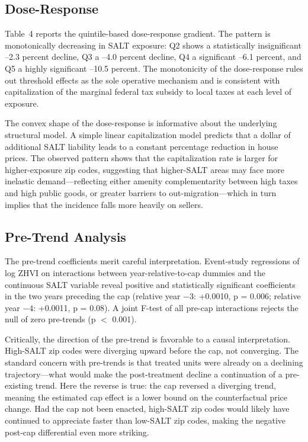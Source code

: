 \documentclass[12pt]{article}
\begin{document}
\subsection{Dose-Response}

Table~4 reports the quintile-based dose-response gradient. The pattern is monotonically decreasing in SALT exposure: Q2 shows a statistically insignificant --2.3 percent decline, Q3 a --4.0 percent decline, Q4 a significant --6.1 percent, and Q5 a highly significant --10.5 percent. The monotonicity of the dose-response rules out threshold effects as the sole operative mechanism and is consistent with capitalization of the marginal federal tax subsidy to local taxes at each level of exposure.



The convex shape of the dose-response is informative about the underlying structural model. A simple linear capitalization model predicts that a dollar of additional SALT liability leads to a constant percentage reduction in house prices. The observed pattern shows that the capitalization rate is larger for higher-exposure zip codes, suggesting that higher-SALT areas may face more inelastic demand---reflecting either amenity complementarity between high taxes and high public goods, or greater barriers to out-migration---which in turn implies that the incidence falls more heavily on sellers.

\subsection{Pre-Trend Analysis}

The pre-trend coefficients merit careful interpretation. Event-study regressions of log ZHVI on interactions between year-relative-to-cap dummies and the continuous SALT variable reveal positive and statistically significant coefficients in the two years preceding the cap (relative year $-3$: +0.0010, p = 0.006; relative year $-4$: +0.0011, p = 0.08). A joint F-test of all pre-cap interactions rejects the null of zero pre-trends (p $<$ 0.001).

Critically, the direction of the pre-trend is favorable to a causal interpretation. High-SALT zip codes were diverging upward before the cap, not converging. The standard concern with pre-trends is that treated units were already on a declining trajectory---what would make the post-treatment decline a continuation of a pre-existing trend. Here the reverse is true: the cap reversed a diverging trend, meaning the estimated cap effect is a lower bound on the counterfactual price change. Had the cap not been enacted, high-SALT zip codes would likely have continued to appreciate faster than low-SALT zip codes, making the negative post-cap differential even more striking.
\end{document}
